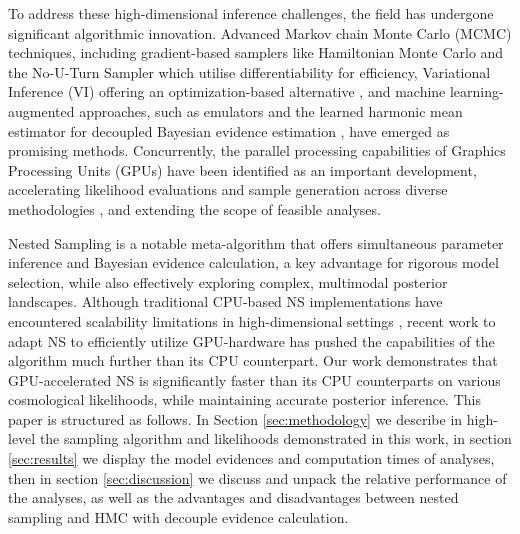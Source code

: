\documentclass[twocolumn]{openjournal}
\begin{document}
To address these high-dimensional inference challenges, the field has undergone significant algorithmic innovation. Advanced Markov chain Monte Carlo (MCMC) techniques, including gradient-based samplers like Hamiltonian Monte Carlo \citep[HMC;][]{Duane87, Neal96} and the No-U-Turn Sampler \citep[NUTS;][]{hoffman14a} which utilise differentiability for efficiency, Variational Inference (VI) offering an optimization-based alternative \citep{Blei_2017,hoffmanVI,VIacceleration}, and machine learning-augmented approaches, such as emulators \citep[e.g.][]{Albers_2019, Manrique_Yus_2019, Mootoovaloo_2020, Arico_2022, Mootoovaloo_2022, SpurioMancini22CosmoPower, Piras_2023, El_Gammal_2023, guenther_2024, Bonici_2024, Bonici_2024_capse, guenther_2025} and the learned harmonic mean estimator for decoupled Bayesian evidence estimation \citep{mcewen2023machinelearningassistedbayesian, polanska2024learnedharmonicmeanestimation, polanska2025learnedharmonicmeanestimation, lin2025savagedickeydensityratioestimation}, have emerged as promising methods. Concurrently, the parallel processing capabilities of Graphics Processing Units (GPUs) have been identified as an important development, accelerating likelihood evaluations and sample generation across diverse methodologies \citep{Gu_2022, GPUacc,metha}, and extending the scope of feasible analyses.

Nested Sampling \citep[NS;][]{Skilling06} is a notable meta-algorithm that offers simultaneous parameter inference and Bayesian evidence calculation, a key advantage for rigorous model selection, while also effectively exploring complex, multimodal posterior landscapes. Although traditional CPU-based NS implementations have encountered scalability limitations in high-dimensional settings \citep{Feroz2009MultiNest}, recent work to adapt NS to efficiently utilize GPU-hardware \citep{NSSyallup} has pushed the capabilities of the algorithm much further than its CPU counterpart. Our work demonstrates that GPU-accelerated NS is significantly faster than its CPU counterparts on various cosmological likelihoods, while maintaining accurate posterior inference. This paper is structured as follows. In Section \ref{sec:methodology} we describe in high-level the sampling algorithm and likelihoods demonstrated in this work, in section \ref{sec:results} we display the model evidences and computation times of analyses, then in section \ref{sec:discussion} we discuss and unpack the relative performance of the analyses, as well as the advantages and disadvantages between nested sampling and HMC with decouple evidence calculation.
\end{document}

